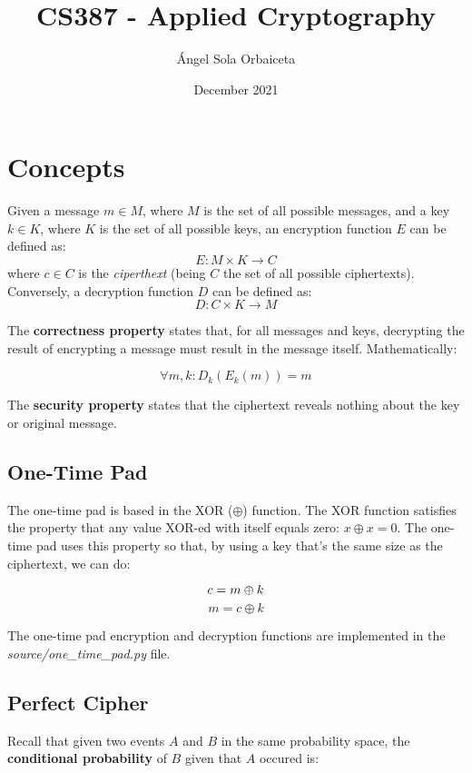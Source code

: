 \documentclass[12pt, letterpaper]{article}
\title{CS387 - Applied Cryptography}
\author{\'Angel Sola Orbaiceta}
\date{December 2021}
\begin{document}
\begin{titlepage}
  \maketitle
\end{titlepage}

\section{Concepts}

Given a message $m \in M$, where $M$ is the set of all possible messages, and a key $k \in K$, where $K$ is the set of all possible keys, an encryption function $E$ can be defined as:
\[
  E: M \times K \to C
\]
where $c \in C$ is the \emph{ciperthext} (being $C$ the set of all possible ciphertexts).
Conversely, a decryption function $D$ can be defined as:
\[
  D: C \times K \to M
\]

The \textbf{correctness property} states that, for all messages and keys, decrypting the result of encrypting a message must result in the message itself.
Mathematically:

\[
  \forall m,k: D_k (E_k(m)) = m
\]

The \textbf{security property} states that the ciphertext reveals nothing about the key or original message.

\subsection{One-Time Pad}

The one-time pad is based in the XOR ($\oplus$) function.
The XOR function satisfies the property that any value XOR-ed with itself equals zero: $x \oplus x = 0$.
The one-time pad uses this property so that, by using a key that's the same size as the ciphertext, we can do:

\[
  c = m \oplus k\\
\]
\[
  m = c \oplus k
\]

The one-time pad encryption and decryption functions are implemented in the \emph{source/one\_time\_pad.py} file.

\subsection{Perfect Cipher}

Recall that given two events $A$ and $B$ in the same probability space, the \textbf{conditional probability} of $B$ given that $A$ occured is:
\end{document}
